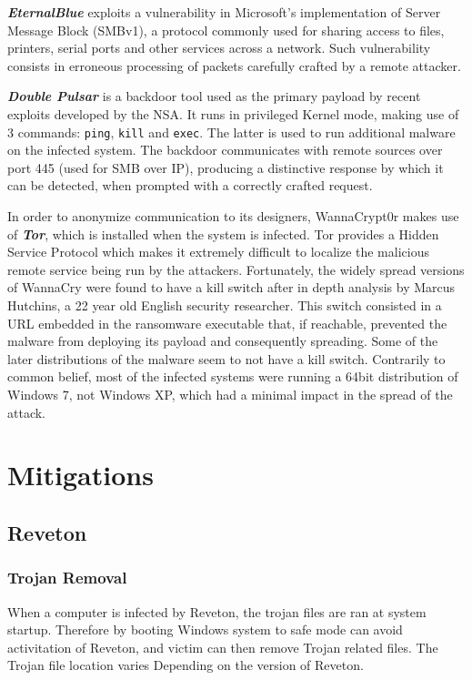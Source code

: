 \documentclass[10pt,a4paper]{article}
\begin{document}
\textbf{\textit{EternalBlue}} exploits a vulnerability in Microsoft's implementation of Server Message Block (SMBv1), a protocol commonly used for sharing access to files, printers, serial ports and other services across a network. Such vulnerability consists in erroneous processing of packets carefully crafted by a remote attacker.

\textbf{\textit{Double Pulsar}} is a backdoor tool used as the primary payload by recent exploits developed by the NSA. It runs in privileged Kernel mode, making use of 3 commands: \texttt{ping}, \texttt{kill} and \texttt{exec}. The latter is used to run additional malware on the infected system. The backdoor communicates with remote sources over port 445 (used for SMB over IP), producing a distinctive response by which it can be detected, when prompted with a correctly crafted request.

In order to anonymize communication to its designers, WannaCrypt0r makes use of \textit{\textbf{Tor}}, which is installed when the system is infected. Tor provides a Hidden Service Protocol which makes it extremely difficult to localize the malicious remote service being run by the attackers.
Fortunately, the widely spread versions of WannaCry were found to have a kill switch after in depth analysis by Marcus Hutchins, a 22 year old English security researcher. This switch consisted in a URL  embedded in the ransomware executable that, if reachable, prevented the malware from deploying its payload and consequently spreading. Some of the later distributions of the malware seem to not have a kill switch. Contrarily to common belief, most of the infected systems were running a 64bit distribution of Windows 7, not Windows XP, which had a minimal impact in the spread of the attack.

\section{Mitigations}

\subsection{Reveton}

\subsubsection{Trojan Removal}
When a computer is infected by Reveton, the trojan files are ran at system startup. Therefore by booting Windows system to safe mode can avoid activitation of Reveton, and victim can then remove Trojan related files. The Trojan file location varies Depending on the version of Reveton.
\end{document}
